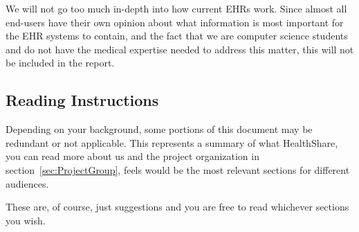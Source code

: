 \documentclass[14pt]{article}
\begin{document}
We will not go too much in-depth into how current \glspl{EHR} work. Since almost all end-users have their own opinion about what information is most important for the \gls{EHR} systems to contain, and the fact that we are computer science students and do not have the medical expertise needed to address this matter, this will not be included in the report.



\subsection{Reading Instructions}
Depending on your background, some portions of this document may be redundant or not applicable. This represents a summary of what HealthShare, you can read more about us and the project organization in section~\ref{sec:ProjectGroup}, feels would be the most relevant sections for different audiences.

These are, of course, just suggestions and you are free to read whichever sections you wish.
\end{document}
